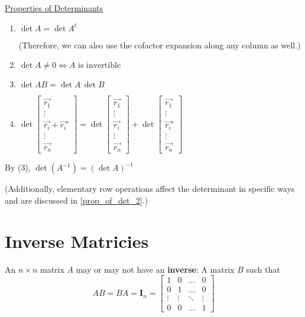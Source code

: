 \documentclass[../main.tex]{subfiles}
\begin{document}
\underline{Properties of Determinants} \label{prop_of_det_1}
\begin{enumerate}
    \item \( \det A = \det A^t \)
    
    (Therefore, we can also use the cofactor expansion along any column as well.)
    \item \( \det A \neq 0 \iff A \text{ is invertible} \)
    \item \( \det AB = \det A \, \det B \)
    \item \( \det \begin{bmatrix}
        \vec{r_1} \\
        \vdots \\
        \vec{r_i}+\vec{r_i}' \\
        \vdots \\
        \vec{r_n}
    \end{bmatrix}
    = \det \begin{bmatrix}
        \vec{r_1} \\
        \vdots \\
        \vec{r_i} \\
        \vdots \\
        \vec{r_n}
    \end{bmatrix}
    + \det \begin{bmatrix}
        \vec{r_1} \\
        \vdots \\
        \vec{r_i}' \\
        \vdots \\
        \vec{r_n}
    \end{bmatrix} \)
\end{enumerate}

\begin{note}
    By (3), \( \det(A^{-1}) = (\det A)^{-1} \)
\end{note}

(Additionally, elementary row operations affect the determinant in specific ways and are discussed in \ref{prop_of_det_2}.)


\section{Inverse Matricies}

An \( n \times n \) matrix \( A \) may or may not have an \textbf{inverse}: A matrix \( B \) such that
\[ AB=BA = \mathbf{I}_n = \begin{bmatrix}
    1 & 0 &  \dots  & 0 \\
    0 & 1 & \dots & 0 \\
    \vdots & \vdots & \ddots & \vdots \\
    0 & 0 & \dots  & 1
\end{bmatrix}
\]
\end{document}
